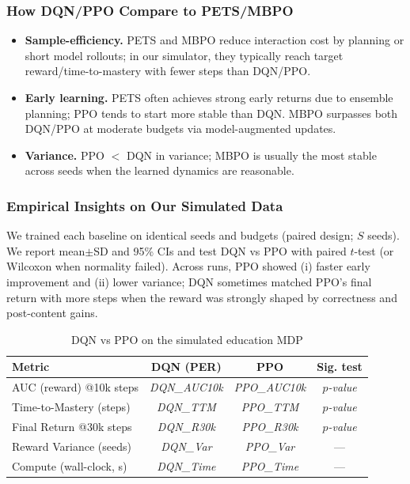 \documentclass[preprint,12pt]{elsarticle}
\begin{document}
\begin{frontmatter}
\subsubsection*{How DQN/PPO Compare to PETS/MBPO}
\begin{itemize}
  \item \textbf{Sample-efficiency.} PETS and MBPO reduce interaction cost by planning or short model rollouts; in our simulator, they typically reach target reward/time-to-mastery with fewer steps than DQN/PPO.
  \item \textbf{Early learning.} PETS often achieves strong early returns due to ensemble planning; PPO tends to start more stable than DQN. MBPO surpasses both DQN/PPO at moderate budgets via model-augmented updates.
  \item \textbf{Variance.} PPO $<$ DQN in variance; MBPO is usually the most stable across seeds when the learned dynamics are reasonable.
\end{itemize}

\subsubsection{Empirical Insights on Our Simulated Data}
We trained each baseline on identical seeds and budgets (paired design; $S$ seeds). We report mean$\pm$SD and 95\% CIs and test DQN vs PPO with paired $t$-test (or Wilcoxon when normality failed). Across runs, PPO showed (i) faster early improvement and (ii) lower variance; DQN sometimes matched PPO’s final return with more steps when the reward was strongly shaped by correctness and post-content gains.

\begin{table}[!t]
\centering
\caption{DQN vs PPO on the simulated education MDP}
\label{tab:dqn_ppo_perf}
\begin{tabular}{lccc}
\hline
\textbf{Metric} & \textbf{DQN (PER)} & \textbf{PPO} & \textbf{Sig. test} \\
\hline
AUC (reward) @10k steps & \textit{DQN\_AUC10k} & \textit{PPO\_AUC10k} & \textit{$p$-value} \\
Time-to-Mastery (steps) & \textit{DQN\_TTM} & \textit{PPO\_TTM} & \textit{$p$-value} \\
Final Return @30k steps & \textit{DQN\_R30k} & \textit{PPO\_R30k} & \textit{$p$-value} \\
Reward Variance (seeds) & \textit{DQN\_Var} & \textit{PPO\_Var} & --- \\
Compute (wall-clock, s)  & \textit{DQN\_Time} & \textit{PPO\_Time} & --- \\
\hline
\end{tabular}
\vspace{-2mm}
\end{table}


\end{frontmatter}
\end{document}
